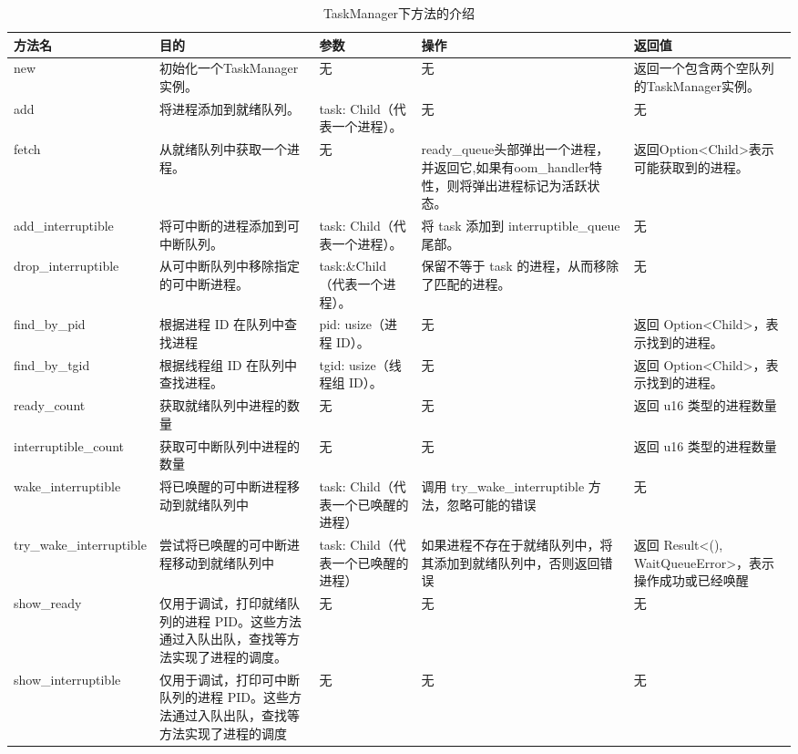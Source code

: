 \begin{table}[H]
    \centering
    \caption{TaskManager下方法的介绍}
    \begin{tabularx}{17cm}{|X|X|X|X|X|}
        \hline
        方法名 & 目的 & 参数 & 操作 & 返回值 \\
        \hline
        new & 初始化一个TaskManager实例。& 无 & 无 & 返回一个包含两个空队列的TaskManager实例。 \\
        \hline
        add & 将进程添加到就绪队列。 & task: Child（代表一个进程）。 & 无 & 无 \\
        \hline
        fetch & 从就绪队列中获取一个进程。 & 无 & ready_queue头部弹出一个进程，并返回它,如果有oom_handler特性，则将弹出进程标记为活跃状态。 & 返回Option<Child>表示可能获取到的进程。 \\
        \hline
        add_interruptible & 将可中断的进程添加到可中断队列。 & task: Child（代表一个进程）。 & 将 task 添加到 interruptible_queue 尾部。 & 无 \\
        \hline
        drop_interruptible & 从可中断队列中移除指定的可中断进程。 & task:\&Child（代表一个进程）。 & 保留不等于 task 的进程，从而移除了匹配的进程。 & 无 \\
        \hline
        find_by_pid & 根据进程 ID 在队列中查找进程 & pid: usize（进程 ID）。 & 无 & 返回 Option<Child>，表示找到的进程。 \\
        \hline
        find_by_tgid & 根据线程组 ID 在队列中查找进程。 & tgid: usize（线程组 ID）。 & 无 & 返回 Option<Child>，表示找到的进程。 \\
        \hline
        ready_count & 获取就绪队列中进程的数量 & 无 & 无 & 返回 u16 类型的进程数量 \\
        \hline
        interruptible_count	& 获取可中断队列中进程的数量 & 无 & 无 & 返回 u16 类型的进程数量 \\
        \hline
        wake_interruptible & 将已唤醒的可中断进程移动到就绪队列中 & task: Child（代表一个已唤醒的进程） & 调用 try_wake_interruptible 方法，忽略可能的错误 & 无 \\
        \hline
        try_wake_interruptible & 尝试将已唤醒的可中断进程移动到就绪队列中 & task: Child（代表一个已唤醒的进程） & 如果进程不存在于就绪队列中，将其添加到就绪队列中，否则返回错误 & 返回 Result<(), WaitQueueError>，表示操作成功或已经唤醒 \\
        \hline
        show_ready & 仅用于调试，打印就绪队列的进程 PID。这些方法通过入队出队，查找等方法实现了进程的调度。 & 无 & 无 & 无 \\
        \hline
        show_interruptible & 仅用于调试，打印可中断队列的进程 PID。这些方法通过入队出队，查找等方法实现了进程的调度 & 无 & 无 & 无 \\
        \hline
    \end{tabularx}
\end{table}
